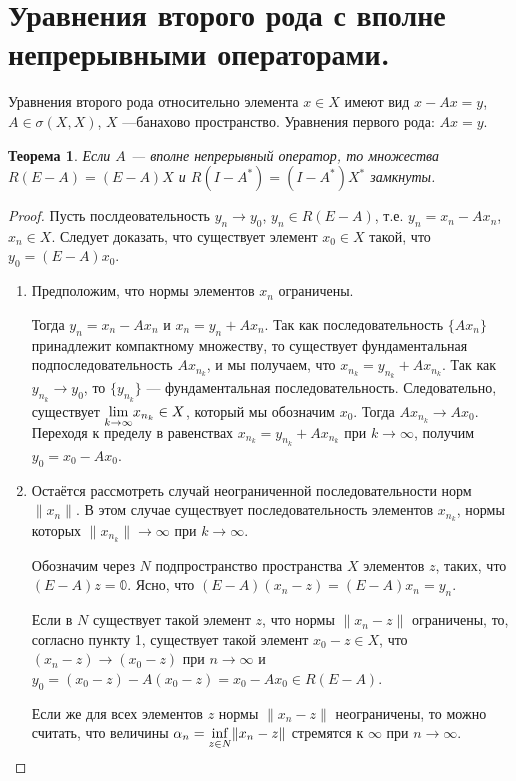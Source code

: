 \documentclass[12pt,a4paper,titlepage,oneside]{book}
\theoremstyle{definition}
\theoremstyle{plain}
\newtheorem*{theorem}{Теорема}
\theoremstyle{break}
\theoremstyle{remark}
\theoremstyle{remark}
\theoremstyle{remark}
\theoremstyle{remark}
\theoremstyle{plain}
\theoremstyle{plain}
\begin{document}
\section{Уравнения второго рода с вполне непрерывными операторами.}
Уравнения второго рода относительно элемента $x \in X$ имеют вид $x-Ax=y$, $A \in \sigma(X,X)$, $X$ ---банахово пространство. Уравнения первого рода: $Ax=y$.

\begin{theorem}
Если $A$ --- вполне непрерывный оператор, то множества $R(E-A)=(E-A)X$ и $R(I-A^*)=(I-A^*)X^*$ замкнуты.
\end{theorem}
\begin{proof}
Пусть послдеовательность $y_n \to y_0$, $y_n \in R(E-A)$, т.е. $y_n=x_n-Ax_n$, $x_n \in X$. Следует доказать, что существует элемент $x_0 \in X$ такой, что $y_0=(E-A)x_0$.
\begin{enumerate}

	\item Предположим, что нормы элементов $x_n$ ограничены.

Тогда $y_n=x_n-Ax_n$ и $x_n=y_n+Ax_n$. Так как последовательность $\lbrace Ax_n \rbrace$ принадлежит компактному множеству, то существует фундаментальная подпоследовательность $Ax_{n_k}$, и мы получаем, что $x_{n_k}=y_{n_k}+Ax_{n_k}$. Так как $y_{n_k} \to y_0$, то $\{y_{n_k}\}$ --- фундаментальная последовательность. Следовательно, существует $\smash{\displaystyle\lim_{k \to \infty}} x_{n_k} \in X$, который мы обозначим $x_0$. Тогда $Ax_{n_k} \to Ax_0$. Переходя к пределу в равенствах $x_{n_k}=y_{n_k}+Ax_{n_k}$ при $k \to \infty$, получим $y_0=x_0-Ax_0$.
	
	\item Остаётся рассмотреть случай неограниченной последовательности норм $\lVert x_n \rVert$. В этом случае существует последовательность элементов $x_{n_k}$, нормы которых $\lVert x_{n_k} \rVert \to \infty$ при $k \to \infty$.
	
	Обозначим через $N$ подпространство пространства $X$ элементов $z$, таких, что $(E-A)z=\mathbb{0}$. Ясно, что $(E-A)(x_n-z)=(E-A)x_n=y_n$.
	
	Если в $N$ существует такой элемент $z$, что нормы $\lVert x_n-z \rVert$ ограничены, то, согласно пункту 1, существует такой элемент $x_0-z \in X$, что $(x_n-z)\to (x_0-z)$ при $n \to \infty$ и $y_0=(x_0-z)-A(x_0-z)=x_0-Ax_0 \in R(E-A)$.
	
	Если же для всех элементов $z$ нормы $\lVert x_n-z \rVert$ неограничены, то можно считать, что величины $\alpha_n=\smash{\displaystyle\inf_{z \in N}} \lVert x_n-z \rVert$ стремятся к $\infty$ при $n \to \infty$.
	

\end{enumerate}
\end{proof}
\end{document}
